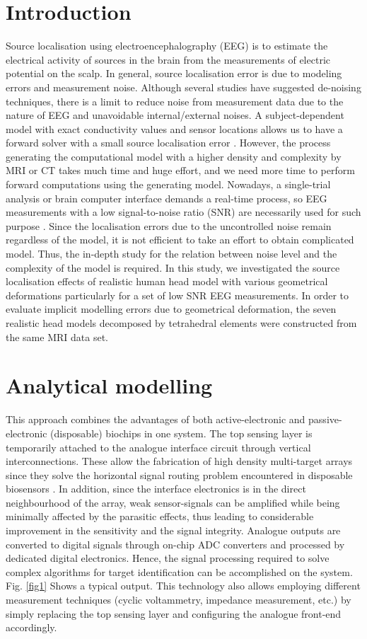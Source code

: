 \documentclass[twocolumn]{htl-author}
\begin{document}
\section{Introduction}
Source localisation using electroencephalography (EEG) is to estimate the electrical activity of sources in the brain from the measurements of electric potential on the scalp. In general, source localisation error is due to modeling errors and measurement noise. Although several studies \cite{1,2} have suggested de-noising techniques, there is a limit to reduce noise from measurement data due to the nature of EEG and unavoidable internal/external noises. A subject-dependent model with exact conductivity values and sensor locations allows us to have a forward solver with a small source localisation error \cite{3}. However, the process
generating the computational model with a higher density and complexity by MRI or CT takes much time and huge effort, and we need more time to perform forward computations using the generating model. Nowadays,
a single-trial analysis or brain computer interface demands a real-time process, so EEG measurements with a low signal-to-noise ratio (SNR) are necessarily used for such purpose \cite{4}. Since the localisation errors due to the uncontrolled noise remain regardless of the model, it is not efficient to take an effort to obtain complicated model. Thus, the in-depth study for the relation between noise level and the complexity of the model is required. In this study, we investigated the source localisation effects of realistic human head model with various geometrical deformations particularly for a set of low SNR EEG measurements. In order to evaluate implicit modelling errors due to geometrical deformation, the seven realistic head models decomposed by tetrahedral elements were constructed from the same MRI data set.


\section{Analytical modelling}
This approach combines the advantages of both active-electronic and passive-electronic (disposable) biochips in one system. The top sensing layer is temporarily attached to the analogue interface circuit through vertical interconnections. These allow the fabrication of high density multi-target arrays since they solve the horizontal signal routing problem encountered in disposable biosensors \cite{5}. In addition, since the interface electronics is in the direct neighbourhood of the array, weak sensor-signals can be amplified while being minimally affected by the parasitic effects, thus leading to considerable improvement in the sensitivity and the signal integrity. Analogue outputs are converted to digital signals through on-chip ADC converters and processed by dedicated digital electronics. Hence, the signal processing required to solve complex algorithms for target identification can be accomplished on the system. Fig. \ref{fig1} Shows a typical output. This technology also allows employing different measurement techniques (cyclic voltammetry, impedance measurement, etc.) by simply replacing the top sensing layer and configuring the analogue front-end accordingly.
\end{document}
